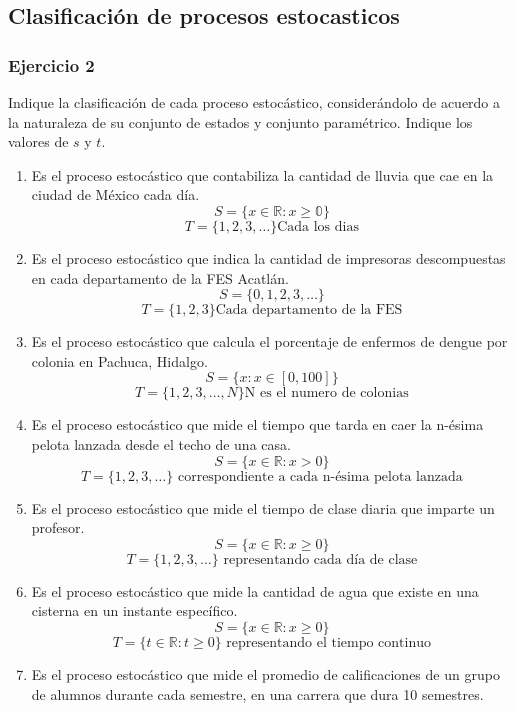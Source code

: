 \documentclass{article}
\begin{document}
\newpage

\subsection{Clasificación de procesos estocasticos}

\subsubsection{Ejercicio 2}

Indique la clasificación de cada proceso estocástico, considerándolo de acuerdo a la naturaleza de su conjunto de estados y conjunto paramétrico. Indique los valores de \( s \) y \( t \).

\begin{enumerate}
    \item Es el proceso estocástico que contabiliza la cantidad de lluvia que cae en la ciudad de México cada día.
          \[S = \{x \in \mathbb{R} : x \geq \mathbb{0}\}\]
          \[T = \{1,2,3,\dots\} \text{Cada los dias}\]
    \item Es el proceso estocástico que indica la cantidad de impresoras descompuestas en cada departamento de la FES Acatlán.
          \[S = \{0,1,2,3,\dots\} \]
          \[T = \{1,2,3\} \text{Cada departamento de la FES}\]
    \item Es el proceso estocástico que calcula el porcentaje de enfermos de dengue por colonia en Pachuca, Hidalgo.
          \[S = \{x : x \in [0, 100]\} \]
          \[T = \{1,2,3,\dots,N\} \text{N es el numero de colonias}\]
    \item Es el proceso estocástico que mide el tiempo que tarda en caer la n-ésima pelota lanzada desde el techo de una casa.
          \[S = \{x \in \mathbb{R} : x > 0\}\]
          \[ T = \{1,2,3,\dots\} \text{ correspondiente a cada n-ésima pelota lanzada} \]
    \item Es el proceso estocástico que mide el tiempo de clase diaria que imparte un profesor.
          \[ S = \{x \in \mathbb{R} : x \geq 0\} \]
          \[ T = \{1,2,3,\dots\} \text{ representando cada día de clase} \]
    \item Es el proceso estocástico que mide la cantidad de agua que existe en una cisterna en un instante específico.
          \[ S = \{x \in \mathbb{R} : x \geq 0\} \]
          \[ T = \{t \in \mathbb{R} : t \geq 0\} \text{ representando el tiempo continuo} \]
    \item Es el proceso estocástico que mide el promedio de calificaciones de un grupo de alumnos durante cada semestre, en una carrera que dura 10 semestres.

\end{enumerate}
\end{document}
